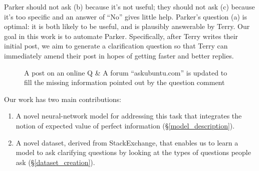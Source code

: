 \documentclass[11pt,a4paper]{article}
\begin{document}
\noindent
Parker should not ask (b) because it's not useful; they should not ask (c) because it's too specific and an answer of ``No'' gives little help.
Parker's question (a) is optimal: it is both likely to be useful, and is plausibly answerable by Terry.
Our goal in this work is to automate Parker.
Specifically, after Terry writes their initial post, we aim to generate a clarification question so that Terry can immediately amend their post in hopes of getting faster and better replies.
\begin{figure}[!t]
	\centering
	\setlength\fboxsep{1pt}
	\setlength\fboxrule{0.5pt}
	\caption{A post on an online Q \& A forum ``askubuntu.com'' is updated to fill the missing information pointed out by the question comment}
	\label{askubuntu_post}
\end{figure}
%
Our work has two main contributions: 
\begin{enumerate}
	\item A novel neural-network model for addressing this task that integrates the notion of expected value of perfect information (\S\ref{model_description}). %
	\item A novel dataset, derived from StackExchange, that enables us to learn a model to ask clarifying questions by looking at the types of questions people ask (\S\ref{dataset_creation}). %
\end{enumerate}
\end{document}
